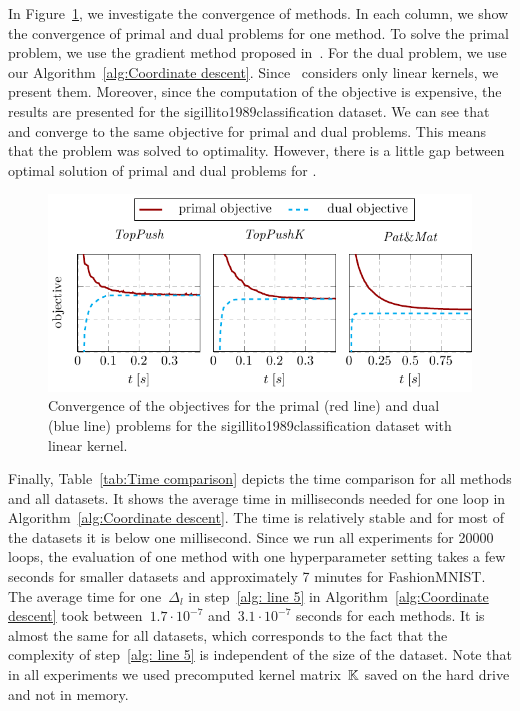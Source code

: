 In Figure~\ref{fig:Convergence comparison}, we investigate the convergence of methods. In each column, we show the convergence of primal and dual problems for one method. To solve the primal problem, we use the gradient method proposed in~\cite{adam2021general}. For the dual problem, we use our Algorithm~\ref{alg:Coordinate descent}. Since~\cite{adam2021general} considers only linear kernels, we present them. Moreover, since the computation of the objective is expensive, the results are presented for the sigillito1989classification dataset. We can see that \TopPush and \TopPushK converge to the same objective for primal and dual problems. This means that the problem was solved to optimality. However, there is a little gap between optimal solution of primal and dual problems for \PatMat.

\begin{figure}[!ht]
  \centering
  \includegraphics[width = \linewidth]{images/dual_results3.pdf}
  \caption{Convergence of the objectives for the primal (red line) and dual (blue line) problems for the sigillito1989classification dataset with linear kernel.}
  \label{fig:Convergence comparison}
\end{figure}

Finally, Table~\ref{tab:Time comparison} depicts the time comparison for all methods and all datasets. It shows the average time in milliseconds needed for one \repeatloop loop in Algorithm~\ref{alg:Coordinate descent}. The time is relatively stable and for most of the datasets it is below one millisecond. Since we run all experiments for 20000 \repeatloop loops, the evaluation of one method with one hyperparameter setting takes a few seconds for smaller datasets and approximately 7 minutes for FashionMNIST. The average time for one~$\Delta_l$ in step~\ref{alg: line 5} in Algorithm~\ref{alg:Coordinate descent} took between~$1.7\cdot 10^{-7}$ and~$3.1\cdot 10^{-7}$ seconds for each methods. It is almost the same for all datasets, which corresponds to the fact that the complexity of step~\ref{alg: line 5} is independent of the size of the dataset. Note that in all experiments we used precomputed kernel matrix~$\mathbb{K}$ saved on the hard drive and not in memory.

